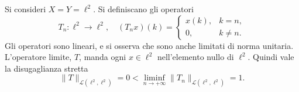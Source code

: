 \begin{example}
  Si consideri \(X = Y = \ell^2\). Si definiscano gli operatori
  \[
    T_n : \ell^2 \to \ell^2, \quad (T_n x)(k) = \begin{cases}
      x(k), & k = n, \\
      0, & k \neq n. \end{cases}
  \]
  Gli operatori sono lineari, e si osserva che sono anche limitati di norma unitaria. L'operatore limite, \(T\), manda ogni \(x \in \ell^2\) nell'elemento nullo di \(\ell^2\). Quindi vale la disugaglianza stretta
  \[
      \|T\|_{\mathcal L(\ell^2, \ell^2)} = 0 < \liminf_{n \to +\infty} \|T_n\|_{\mathcal L(\ell^2, \ell^2)} = 1.
  \]
\end{example}
